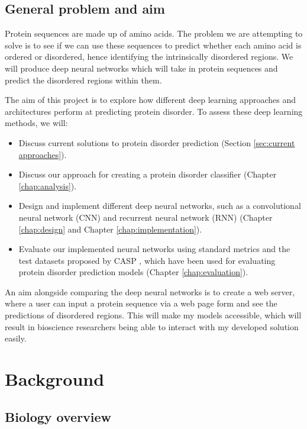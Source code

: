 \documentclass{l4proj}
\begin{document}
\section{General problem and aim}

Protein sequences are made up of amino acids. The problem we are attempting to solve is to see if we can use these sequences to predict whether each amino acid is ordered or disordered, hence identifying the intrinsically disordered regions. We will produce deep neural networks which will take in protein sequences and predict the disordered regions within them. 

The aim of this project is to explore how different deep learning approaches and architectures perform at predicting protein disorder. To assess these deep learning methods, we will: 
\begin{itemize}
    \item Discuss current solutions to protein disorder prediction (Section \ref{sec:current approaches}).
    \item Discuss our approach for creating a protein disorder classifier (Chapter \ref{chap:analysis}).
    \item Design and implement different deep neural networks, such as a convolutional neural network (CNN) and recurrent neural network (RNN) (Chapter \ref{chap:design} and Chapter \ref{chap:implementation}). 
    \item Evaluate our implemented neural networks using standard metrics and the test datasets proposed by CASP \citep{casp}, which have been used for evaluating protein disorder prediction models (Chapter \ref{chap:evaluation}). 
\end{itemize}
An aim alongside comparing the deep neural networks is to create a web server, where a user can input a protein sequence via a web page form and see the predictions of disordered regions. This will make my models accessible, which will result in bioscience researchers being able to interact with my developed solution easily.


\chapter{Background}
\label{chap:background}

\section{Biology overview}
\end{document}
